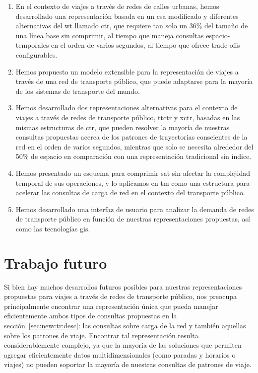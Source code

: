     \begin{enumerate}
        \item En el contexto de viajes a trav\'es de redes de calles urbanas, hemos desarrollado una representaci\'on basada en un \gls{csa} modificado y diferentes alternativas del \gls{wt} llamado \gls{ctr}, que requiere tan solo un 36\% del tama\~no de una l\'inea base sin comprimir, al tiempo que maneja consultas espacio-temporales en el orden de varios \micro segundos, al tiempo que ofrece trade-offs configurables.
        
        \item Hemos propuesto un modelo extensible para la representaci\'on de viajes a trav\'es de una red de transporte p\'ublico, que puede adaptarse para la mayor\'ia de los sistemas de transporte del mundo.
        
        \item Hemos desarrollado dos representaciones alternativas para el contexto de viajes a trav\'es de redes de transporte p\'ublico, \gls{ttctr} y \gls{xctr}, basadas en las mismas estructuras de \gls{ctr}, que pueden resolver la mayor\'ia de nuestras consultas propuestas acerca de los patrones de trayectorias conscientes de la red en el orden de varios \micro segundos, mientras que solo se necesita alrededor del 50\% de espacio en comparaci\'on con una representaci\'on tradicional sin \'indice.
        
        \item Hemos presentado un esquema para comprimir \gls{sat} sin afectar la complejidad temporal de sus operaciones, y lo aplicamos en \gls{tm} como una estructura para acelerar las consultas de carga de red en el contexto del transporte p\'ublico.
        
        \item Hemos desarrollado una interfaz de usuario para analizar la demanda de redes de transporte p\'ublico en funci\'on de nuestras representaciones propuestas, as\'i como las tecnolog\'ias \gls{gis}.
    \end{enumerate}


\section{Trabajo futuro}
\label{sec:appendix-spanishsummary:trabajo-futuro}
    Si bien hay muchos desarrollos futuros posibles para nuestras representaciones propuestas para viajes a trav\'es de redes de transporte p\'ublico, nos preocupa principalmente encontrar una representaci\'on \'unica que pueda manejar eficientemente ambos tipos de consultas propuestas en la secci\'on~\ref{sec:newctr:desc}: las consultas sobre carga de la red y tambi\'en aquellas sobre los patrones de viaje. Encontrar tal representaci\'on resulta considerablemente complejo, ya que la mayor\'ia de las soluciones que permiten agregar eficientemente datos multidimensionales (como paradas y horarios o viajes) no pueden soportar la mayor\'ia de nuestras consultas de patrones de viaje.

